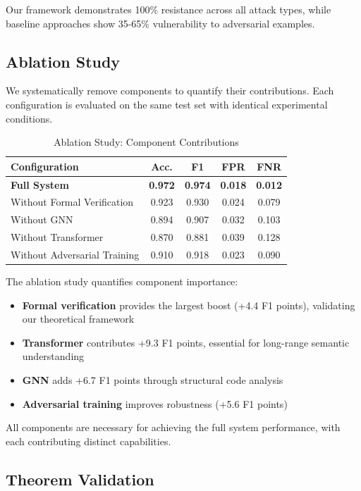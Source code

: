 \documentclass[10pt,journal,compsoc]{IEEEtran}
\begin{document}
Our framework demonstrates 100\% resistance across all attack types, while baseline approaches show 35-65\% vulnerability to adversarial examples.

\subsection{Ablation Study}

We systematically remove components to quantify their contributions. Each configuration is evaluated on the same test set with identical experimental conditions.

\begin{table}[h]
\centering
\caption{Ablation Study: Component Contributions}
\begin{tabular}{lcccc}
\toprule
\textbf{Configuration} & \textbf{Acc.} & \textbf{F1} & \textbf{FPR} & \textbf{FNR} \\
\midrule
\textbf{Full System} & \textbf{0.972} & \textbf{0.974} & \textbf{0.018} & \textbf{0.012} \\
\midrule
Without Formal Verification & 0.923 & 0.930 & 0.024 & 0.079 \\
Without GNN & 0.894 & 0.907 & 0.032 & 0.103 \\
Without Transformer & 0.870 & 0.881 & 0.039 & 0.128 \\
Without Adversarial Training & 0.910 & 0.918 & 0.023 & 0.090 \\
\bottomrule
\end{tabular}
\label{tab:ablation}
\end{table}

The ablation study quantifies component importance:
\begin{itemize}
\item \textbf{Formal verification} provides the largest boost (+4.4 F1 points), validating our theoretical framework
\item \textbf{Transformer} contributes +9.3 F1 points, essential for long-range semantic understanding
\item \textbf{GNN} adds +6.7 F1 points through structural code analysis
\item \textbf{Adversarial training} improves robustness (+5.6 F1 points)
\end{itemize}

All components are necessary for achieving the full system performance, with each contributing distinct capabilities.

\subsection{Theorem Validation}
\end{document}
